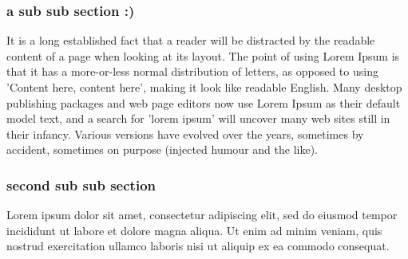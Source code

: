 \documentclass{article}     %
\begin{document}
\subsubsection{a sub sub section :)}

It is a long established fact that a reader will be distracted by the readable 
content of a page when looking at its layout. The point of using Lorem Ipsum is
 that it has a more-or-less normal distribution of letters, as opposed to using 
 'Content here, content here', making it look like readable English. 
 Many desktop publishing packages and web page editors now use Lorem Ipsum as 
 their default model text, and a search for 'lorem ipsum' will uncover many 
 web sites still in their infancy. Various versions have evolved over the years, 
 sometimes by accident, sometimes on purpose (injected humour and the like).
 \subsubsection{second sub sub section}

 Lorem ipsum dolor sit amet, consectetur adipiscing elit, sed do eiusmod tempor 
 incididunt ut labore et dolore magna aliqua. Ut enim ad minim veniam, quis 
 nostrud exercitation ullamco laboris nisi ut aliquip ex ea commodo consequat.
\end{document}
